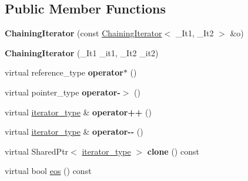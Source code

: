 \subsection*{Public Member Functions}
\begin{DoxyCompactItemize}
\item 
{\bfseries Chaining\+Iterator} (const \hyperlink{classAudio_1_1ChainingIterator}{Chaining\+Iterator}$<$ \+\_\+\+It1, \+\_\+\+It2 $>$ \&o)\hypertarget{classAudio_1_1ChainingIterator_a007f00b467e9672e18001613582a6a2c}{}\label{classAudio_1_1ChainingIterator_a007f00b467e9672e18001613582a6a2c}

\item 
{\bfseries Chaining\+Iterator} (\+\_\+\+It1 \+\_\+it1, \+\_\+\+It2 \+\_\+it2)\hypertarget{classAudio_1_1ChainingIterator_a724fc122ffd04fe6e95c939b1c5f1aea}{}\label{classAudio_1_1ChainingIterator_a724fc122ffd04fe6e95c939b1c5f1aea}

\item 
virtual reference\+\_\+type {\bfseries operator$\ast$} ()\hypertarget{classAudio_1_1ChainingIterator_a5ed0bd6626ce9eae09241c6bf48889a3}{}\label{classAudio_1_1ChainingIterator_a5ed0bd6626ce9eae09241c6bf48889a3}

\item 
virtual pointer\+\_\+type {\bfseries operator-\/$>$} ()\hypertarget{classAudio_1_1ChainingIterator_af9eec049fbb5e048c000151d96aab196}{}\label{classAudio_1_1ChainingIterator_af9eec049fbb5e048c000151d96aab196}

\item 
virtual \hyperlink{classAudio_1_1VirtualIterator}{iterator\+\_\+type} \& {\bfseries operator++} ()\hypertarget{classAudio_1_1ChainingIterator_a17165694fbccffde048e8dc6db7f868c}{}\label{classAudio_1_1ChainingIterator_a17165694fbccffde048e8dc6db7f868c}

\item 
virtual \hyperlink{classAudio_1_1VirtualIterator}{iterator\+\_\+type} \& {\bfseries operator-\/-\/} ()\hypertarget{classAudio_1_1ChainingIterator_aad4cab67c70e4ceb127fb76562350562}{}\label{classAudio_1_1ChainingIterator_aad4cab67c70e4ceb127fb76562350562}

\item 
virtual Shared\+Ptr$<$ \hyperlink{classAudio_1_1VirtualIterator}{iterator\+\_\+type} $>$ {\bfseries clone} () const \hypertarget{classAudio_1_1ChainingIterator_adff0a8ee3ad79d2ccb76b6f91e0b4626}{}\label{classAudio_1_1ChainingIterator_adff0a8ee3ad79d2ccb76b6f91e0b4626}

\item 
virtual bool \hyperlink{classAudio_1_1ChainingIterator_a64a7391285444b1f7dd3468942550bfb}{eos} () const \hypertarget{classAudio_1_1ChainingIterator_a64a7391285444b1f7dd3468942550bfb}{}\label{classAudio_1_1ChainingIterator_a64a7391285444b1f7dd3468942550bfb}


\end{DoxyCompactItemize}
